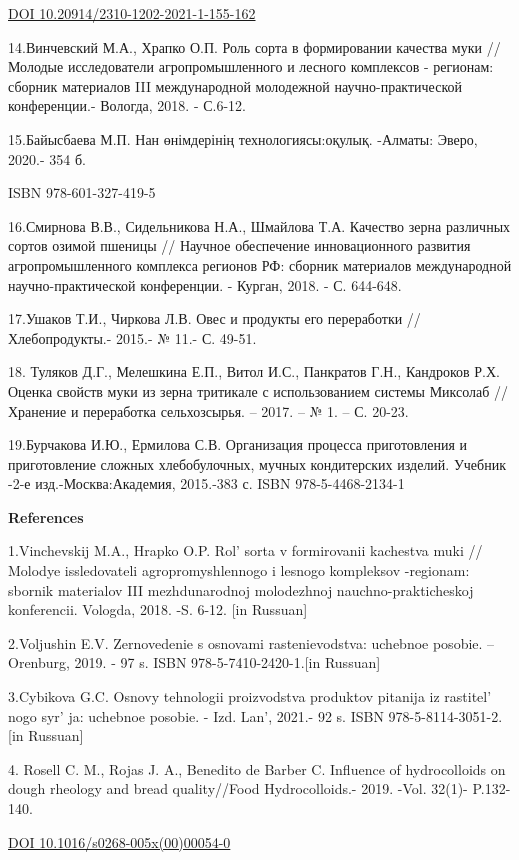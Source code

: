 {{\href{https://doi.org/10.20914/2310-1202-2021-1-155-162}{DOI
10.20914/2310-1202-2021-1-155-162}

14.Винчевский М.А., Храпко О.П. Роль сорта в формировании качества муки
// Молодые исследователи агропромышленного и лесного комплексов -
регионам: сборник материалов III международной молодежной
научно-практической конференции.- Вологда, 2018. - С.6-12.

15.Байысбаева М.П. Нан өнімдерінің технологиясы:оқулық. -Алматы: Эверо,
2020.- 354 б.

ISBN 978-601-327-419-5

16.Смирнова В.В., Сидельникова Н.А., Шмайлова Т.А. Качество зерна
различных сортов озимой пшеницы // Научное обеспечение инновационного
развития агропромышленного комплекса регионов РФ: сборник материалов
международной научно-практической конференции. - Курган, 2018. - С.
644-648.

17.Ушаков Т.И., Чиркова Л.В. Овес и продукты его переработки
//Хлебопродукты.- 2015.- № 11.- С. 49-51.

18. Туляков Д.Г., Мелешкина Е.П., Витол И.С., Панкратов Г.Н., Кандроков
Р.Х. Оценка свойств муки из зерна тритикале с использованием системы
Миксолаб // Хранение и переработка сельхозсырья. -- 2017. -- № 1. -- С.
20-23.

19.Бурчакова И.Ю., Ермилова С.В. Организация процесса приготовления и
приготовление сложных хлебобулочных, мучных кондитерских изделий.
Учебник -2-е изд.-Москва:Академия, 2015.-383 с. ISBN 978-5-4468-2134-1

{\bfseries References}

1.Vinchevskij M.A., Hrapko O.P. Rol'{} sorta v
formirovanii kachestva muki // Molodye issledovateli agropromyshlennogo
i lesnogo kompleksov -regionam: sbornik materialov III mezhdunarodnoj
molodezhnoj nauchno-prakticheskoj konferencii. Vologda, 2018. -S. 6-12.
{[}in Russuan{]}

2.Voljushin E.V. Zernovedenie s osnovami rastenievodstva: uchebnoe
posobie. -- Orenburg, 2019. - 97 s. ISBN 978-5-7410-2420-1.{[}in
Russuan{]}

3.Cybikova G.C. Osnovy tehnologii proizvodstva produktov pitanija iz
rastitel' nogo syr' ja: uchebnoe posobie.
- Izd. Lan', 2021.- 92 s. ISBN 978-5-8114-3051-2. {[}in
Russuan{]}

4. Rosell C. M., Rojas J. A., Benedito de Barber C. Influence of
hydrocolloids on dough rheology and bread quality//Food Hydrocolloids.-
2019. -Vol. 32(1)- P.132-140.

\href{https://doi.org/10.1016/s0268-005x(00)00054-0}{DOI
10.1016/s0268-005x(00)00054-0}

}}
